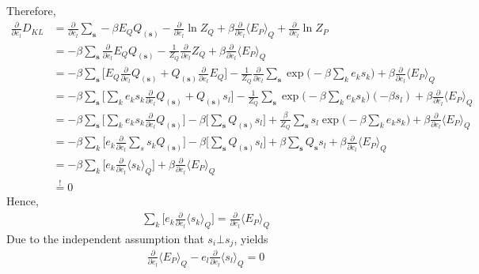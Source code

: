 Therefore, 
\begin{align*}
	\frac{\partial}{\partial e_l} D_{KL}  &= \frac{\partial}{\partial e_l} \sum_{\boldsymbol{s}} -\beta  E_Q Q_{(\boldsymbol{s})}  - \frac{\partial}{\partial e_l} \ln Z_Q  + \beta \frac{\partial}{\partial e_l} \langle E_P \rangle_Q +\frac{\partial}{\partial e_l} \ln Z_P \\
	&=  -\beta  \sum_{\boldsymbol{s}} \frac{\partial}{\partial e_l}  E_Q Q_{(\boldsymbol{s})}  - \frac{1}{Z_Q} \frac{\partial}{\partial e_l} Z_Q  + \beta \frac{\partial}{\partial e_l} \langle E_P \rangle_Q \\
	&=   -\beta \sum_{\boldsymbol{s}} \bigg[  E_Q \frac{\partial}{\partial e_l}Q_{(\boldsymbol{s})}  + Q_{(\boldsymbol{s})} \frac{\partial}{\partial e_l} E_Q   \bigg ]- \frac{1}{Z_Q} \frac{\partial}{\partial e_l} \sum_{\boldsymbol{s}} \exp{ \bigg ( -\beta \sum_{k} e_k s_k \bigg) } + \beta \frac{\partial}{\partial e_l} \langle E_P \rangle_Q \\
	&=   -\beta \sum_{\boldsymbol{s}} \bigg[  \sum_{k} e_k s_k \frac{\partial}{\partial e_l}Q_{(\boldsymbol{s})}  + Q_{(\boldsymbol{s})} s_l   \bigg ]- \frac{1}{Z_Q}  \sum_{\boldsymbol{s}} \exp{ \bigg ( -\beta \sum_{k} e_k s_k \bigg) } ( -\beta s_l  ) + \beta \frac{\partial}{\partial e_l} \langle E_P \rangle_Q \\
	&=   -\beta \sum_{\boldsymbol{s}} \bigg[  \sum_{k} e_k s_k \frac{\partial}{\partial e_l}Q_{(\boldsymbol{s})}   \bigg ]   -   \beta \bigg [ \sum_{\boldsymbol{s}}  Q_{(\boldsymbol{s})} s_l   \bigg ] + \frac{\beta}{Z_Q}  \sum_{\boldsymbol{s}} s_l \exp{ \bigg ( -\beta \sum_{k} e_k s_k \bigg) }  + \beta \frac{\partial}{\partial e_l} \langle E_P \rangle_Q \\
	&=   -\beta \sum_{k} \bigg[  e_k \frac{\partial}{\partial e_l} \sum_{s}   s_k Q_{(\boldsymbol{s})}   \bigg ]   -   \beta \bigg [ \sum_{\boldsymbol{s}}  Q_{(\boldsymbol{s})} s_l   \bigg ] + \beta  \sum_{\boldsymbol{s}} Q_{\boldsymbol{s}} s_l   + \beta \frac{\partial}{\partial e_l} \langle E_P \rangle_Q \\
		&=   -\beta \sum_{k} \bigg[  e_k \frac{\partial}{\partial e_l} \langle  s_k \rangle_Q   \bigg ]   + \beta \frac{\partial}{\partial e_l} \langle E_P \rangle_Q \\
		&\stackrel{!}{=} 0
\end{align*}
Hence, 
\begin{align*}
\sum_{k} \bigg[  e_k \frac{\partial}{\partial e_l} \langle  s_k \rangle_Q   \bigg ]   =  \frac{\partial}{\partial e_l} \langle E_P \rangle_Q 
\end{align*}
Due to the independent assumption that $s_i \bot s_j$, yields
\begin{align*}
\frac{\partial}{\partial e_l} \langle E_P \rangle_Q  -   e_l \frac{\partial}{\partial e_l} \langle  s_l \rangle_Q = 0
\end{align*}

